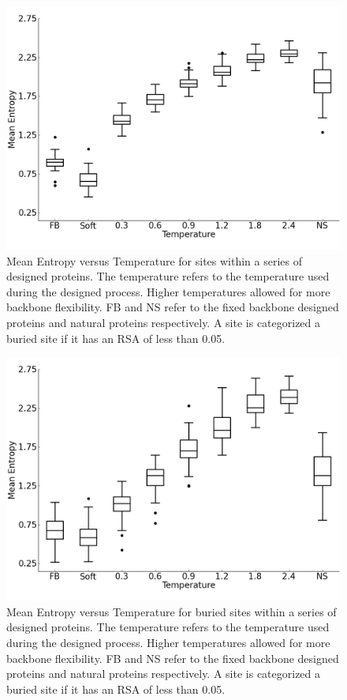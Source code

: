 \documentclass[12pt]{article}
\begin{document}
\begin{figure}[H]
\centerline{\includegraphics[width = 6in]{figures/Mean_Entropy_vs_Temp_Boxplot_Noah.png}}
\caption{Mean Entropy versus Temperature for sites within a series of designed proteins. The temperature refers to the temperature used during the designed process. Higher temperatures allowed for more backbone flexibility. FB and NS refer to the fixed backbone designed proteins and natural proteins respectively.  A site is categorized a buried site if it has an RSA of less than 0.05.}
\label{Mean_Entropy_Noah}
\end{figure}

\begin{figure}[H]
\centerline{\includegraphics[width = 6in]{figures/Mean_Entropy_vs_Temp_Buried_Boxplot_Noah.png}}
\caption{Mean Entropy versus Temperature for buried sites within a series of designed proteins. The temperature refers to the temperature used during the designed process. Higher temperatures allowed for more backbone flexibility. FB and NS refer to the fixed backbone designed proteins and natural proteins respectively.  A site is categorized a buried site if it has an RSA of less than 0.05.}
\label{Buried_Entropy_Noah}
\end{figure}
\end{document}
